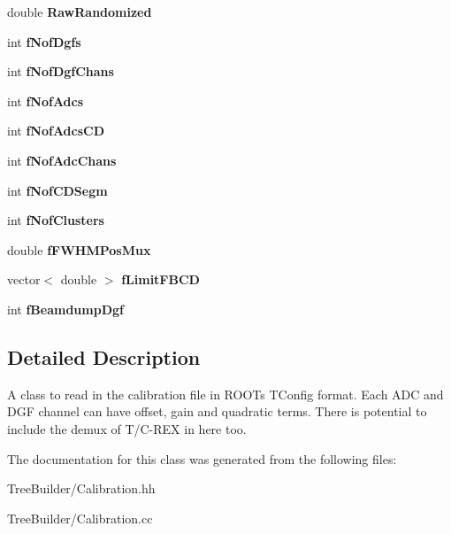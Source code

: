 \begin{DoxyCompactItemize}
double {\bfseries Raw\+Randomized}
\item 
\mbox{\label{class_calibration_a19434507a5b8bbc2cdde3f0b6b4889c7}} 
int {\bfseries f\+Nof\+Dgfs}
\item 
\mbox{\label{class_calibration_af9fcd69a29bc601ccc864105ed805c2e}} 
int {\bfseries f\+Nof\+Dgf\+Chans}
\item 
\mbox{\label{class_calibration_a492ca80c45be9ce1d85dfbf9f5852030}} 
int {\bfseries f\+Nof\+Adcs}
\item 
\mbox{\label{class_calibration_af87f261e5f5b78583250d67e8e08419a}} 
int {\bfseries f\+Nof\+Adcs\+CD}
\item 
\mbox{\label{class_calibration_abfda2f79950ce5ca7bf1aca363519fc5}} 
int {\bfseries f\+Nof\+Adc\+Chans}
\item 
\mbox{\label{class_calibration_ab03c449889b48d77b59ddf242a68ef59}} 
int {\bfseries f\+Nof\+C\+D\+Segm}
\item 
\mbox{\label{class_calibration_a9bbc91e22f4b6ec9b7c42fc7025cdbab}} 
int {\bfseries f\+Nof\+Clusters}
\item 
\mbox{\label{class_calibration_a1e62c67cc989b99f6fc991deabf1641b}} 
double {\bfseries f\+F\+W\+H\+M\+Pos\+Mux}
\item 
\mbox{\label{class_calibration_a659edb01b7d8ae2a574d8513aa6c8ca4}} 
vector$<$ double $>$ {\bfseries f\+Limit\+F\+B\+CD}
\item 
\mbox{\label{class_calibration_a1fc1809a608c626d462fe7d0859d52da}} 
int {\bfseries f\+Beamdump\+Dgf}
\end{DoxyCompactItemize}


\subsection{Detailed Description}
A class to read in the calibration file in R\+O\+OT\textquotesingle{}s T\+Config format. Each A\+DC and D\+GF channel can have offset, gain and quadratic terms. There is potential to include the demux of T/\+C-\/\+R\+EX in here too. 

The documentation for this class was generated from the following files\+:\begin{DoxyCompactItemize}
\item 
Tree\+Builder/Calibration.\+hh\item 
Tree\+Builder/Calibration.\+cc\end{DoxyCompactItemize}
